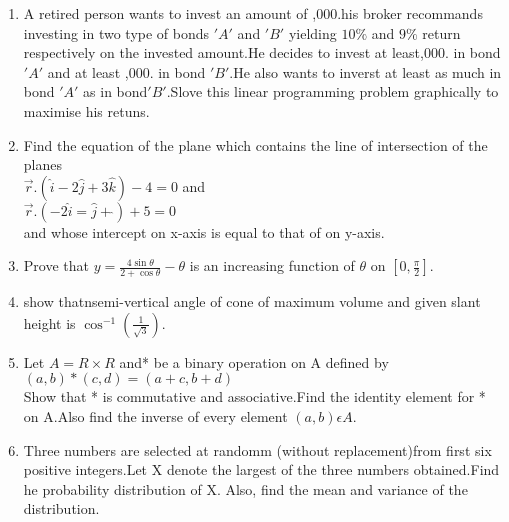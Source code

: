 \documentclass{article}
\begin{document}
\begin{enumerate}
  \item A retired person wants to invest an amount of ,000.his broker recommands investing in two type of bonds $'A'$ and $'B'$ yielding $10\%$ and $9\%$ return respectively on the invested amount.He decides to invest at least,000. in bond $'A'$ and at least ,000. in bond $'B'$.He also wants to inverst at least as much in bond $'A'$ as in bond$'B'$.Slove this linear programming problem graphically to maximise his retuns.


  \item Find the equation of the plane which contains the line of intersection of the planes\\
	  $\overset{\rightarrow}{r}.(\hat{i}-2\hat{j}+3\hat{k})-4=0$ and \\ $\overset{\rightarrow}{r}.(-2\hat{i}=\hat{j}+\hat{})+5=0$\\ and whose intercept on x-axis is equal to that of on y-axis.
    

  \item Prove that $y=\frac{4\sin{\theta}}{2+\cos{\theta}}-\theta$ is an increasing function of $\theta$ on  $[0,\frac{\pi}{2}]$.

  \item  show thatnsemi-vertical angle of cone of maximum volume and given slant height is  $\cos^{-1}(\frac{1}{\sqrt{3}})$.
     
  \item Let $A=R\times R$ and* be a binary operation on A defined by\\ $(a,b)*(c,d)=(a+c,b+d)$\\
	  Show that * is commutative and associative.Find the identity element for * on A.Also find the inverse of every element $(a,b)\epsilon A$.

 
   \item Three numbers are selected at randomm (without replacement)from first six positive integers.Let X denote the largest of the three numbers obtained.Find he probability distribution of X. Also, find the mean and variance of the distribution.

\end{enumerate}
\end{document}
